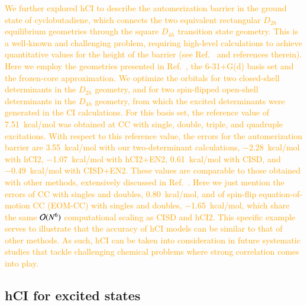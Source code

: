 \documentclass[aip,jcp,reprint,noshowkeys,superscriptaddress]{revtex4-1}
\newcommand{\fk}[1]{\textcolor{orange}{#1}}
\begin{document}
\fk{
We further explored hCI to describe the automerization barrier in the ground state of cyclobutadiene,
which connects the two equivalent rectangular $D_{2h}$ equilibrium geometries through the square $D_{4h}$ transition state geometry. \cite{Bally_1980,Tallarico_1996}
This is a well-known and challenging problem, requiring high-level calculations to achieve quantitative values for the height of the barrier (see Ref.~\onlinecite{Monino_2022} and references therein).
Here we employ the geometries presented in Ref.~\onlinecite{Monino_2022}, the 6-31+G(d) basis set and the frozen-core approximation.
We optimize the orbitals for two closed-shell determinants in the $D_{2h}$ geometry, and for two spin-flipped open-shell determinants in the $D_{4h}$ geometry,
from which the excited determinants were generated in the CI calculations.
For this basis set, the reference value of \SI{7.51}{kcal/mol} was obtained at CC with single, double, triple, and quadruple excitations. \cite{Monino_2022}
With respect to this reference value, the errors for the automerization barrier are
\SI{+3.55}{kcal/mol} with our two-determinant calculations, \SI{-2.28}{kcal/mol} with hCI2, \SI{-1.07}{kcal/mol} with hCI2+EN2, \SI{+0.61}{kcal/mol} with CISD, and \SI{-0.49}{kcal/mol} with CISD+EN2.
These values are comparable to those obtained with other methods, extensively discussed in Ref.~\onlinecite{Monino_2022}.
Here we just mention the errors of CC with singles and doubles, \SI{+0.80}{kcal/mol}, and of spin-flip equation-of-motion CC (EOM-CC) with singles and doubles, \SI{-1.65}{kcal/mol},
which share the same $\order*{N^6}$ computational scaling as CISD and hCI2.
This specific example serves to illustrate that the accuracy of hCI models can be similar to that of other methods.
As such, hCI can be taken into consideration in future systematic studies that tackle challenging chemical problems where strong correlation comes into play.
}

\subsection{hCI for excited states}
\label{sec:res_C}
\end{document}
